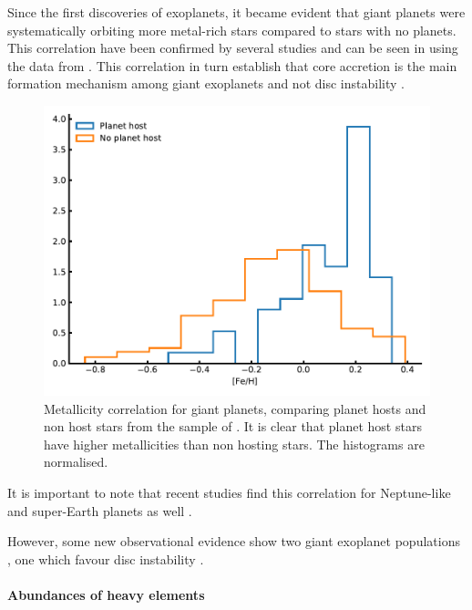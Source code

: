 Since the first discoveries of exoplanets, it became evident that giant planets were systematically
orbiting more metal-rich stars compared to stars with no planets. This correlation have been
confirmed by several studies \citep{Gonzalez1997,Santos2004,Fischer2005,Sousa2008a,Mortier2013b} and
can be seen in  using the data from \citet{Sousa2008a}. This correlation in
turn establish that core accretion is the main formation mechanism among giant exoplanets
\citep{Pollack1996,Ida2004,Mordasini2012} and not disc instability \citep{Boss2002}.

\begin{figure}[htpb!]
    \centering
    \includegraphics[width=1.0\linewidth]{figures/fehCorrelation.pdf}
    \caption{Metallicity correlation for giant planets, comparing planet hosts and non host stars
             from the sample of \citet{Sousa2008a}. It is clear that planet host stars have higher
             metallicities than non hosting stars. The histograms are normalised.}
    \label{fig:fehCorrelation}
\end{figure}

It is important to note that recent studies find this correlation for Neptune-like and
super-Earth planets as well \citep{Wang2015,Zhu2016}.

However, some new observational evidence show two giant exoplanet populations \citep{Santos2017},
one which favour disc instability \citep[see e.g.][]{Nayakshin2017}.

\paragraph{Abundances of heavy elements}

